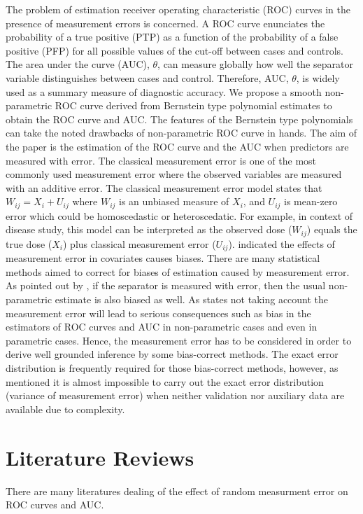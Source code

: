 The problem of estimation receiver operating characteristic (ROC) curves in the presence of measurement errors is concerned. A ROC curve enunciates the probability of a true positive (PTP) as a function of the probability of a false positive (PFP) for all possible values of the cut-off between cases and controls. The area under the curve (AUC), $\theta$, can measure globally how well the separator variable distinguishes between cases and control. Therefore, AUC, $\theta$, is widely used as a summary measure of diagnostic accuracy. We propose a smooth non-parametric ROC curve derived from Bernstein type polynomial estimates to obtain the ROC curve and AUC. The features of the Bernstein type polynomials can take the noted drawbacks of non-parametric ROC curve in hands. The aim of the paper is the estimation of the ROC curve and the AUC when predictors are measured with error. The classical measurement error is one of the most commonly used measurement error where the observed variables are measured with an additive error. The classical measurement error model states that
$
    W_{ij} = X_i + U_{ij}
$
where $W_{ij}$ is an unbiased measure of $X_i$, and $U_{ij}$ is mean-zero error which could be homoscedastic or heteroscedatic. For example, in context of disease study, this model can be interpreted as the observed dose ($W_{ij}$) equals the true dose ($X_i$) plus classical measurement error ($U_{ij}$). \cite{carroll2006measurement} indicated the effects of measurement error in covariates causes biases. There are many statistical methods aimed to correct for biases of estimation caused by measurement error.  As pointed out by \cite{coffin1997receiver}, if the separator is measured with error, then the usual non-parametric estimate is also biased as well. As \cite{carroll2006measurement} states not taking account the measurement error will lead to serious consequences such as bias in the estimators of ROC curves and AUC in non-parametric cases and even in parametric cases. Hence, the measurement error has to be considered in order to derive well grounded inference by some bias-correct methods. The exact error distribution is frequently required for those bias-correct methods, however, as \cite{bertrand2019flexible} mentioned it is almost impossible to carry out the exact error distribution (variance of measurement error) when neither validation nor auxiliary data are available due to complexity.

\section{Literature Reviews}
There are many literatures dealing of the effect of random measurment error on ROC curves and AUC.

